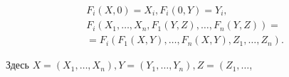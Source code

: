 \documentclass[10pt]{article}
\begin{document}
\[

\begin{gathered}

F_{i}(X, 0)=X_{i}, F_{i}(0, Y)=Y_{i}, \\

F_{i}\left(X_{1}, \ldots, X_{n}, F_{1}(Y, Z), \ldots, F_{n}(Y, Z)\right)= \\

=F_{i}\left(F_{1}(X, Y), \ldots, F_{n}(X, Y), Z_{1}, \ldots, Z_{n}\right) .

\end{gathered}

\]



Здесь $X=\left(X_{1}, \ldots, X_{n}\right), Y=\left(Y_{1}, \ldots, Y_{n}\right), Z=\left(Z_{1}, \ldots\right.$,
\end{document}
